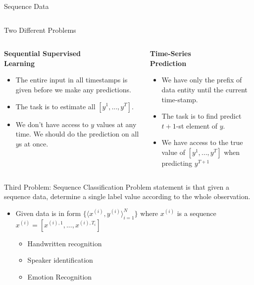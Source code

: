 \documentclass{beamer}
\begin{document}
\begin{frame}{Sequence Data}
\begin{columns}
\begin{column}{0.4\textwidth}
			\end{column}
		\end{columns}
	\end{frame}

	\begin{frame}{Two Different Problems}
		\begin{columns}
			\begin{column}{0.5\textwidth}
				\begin{center}
					\textbf{Sequential Supervised\\ Learning}
					\begin{itemize}
						\item<1-> The entire input in all timestamps is given before we make any predictions.
						\item<2-> The task is to estimate all $[y^1 , ... , y^T]$.
						\item<3-> We don't have access to $y$ values at any time. We should do the prediction on all $y$s at once.
						
					\end{itemize}
				\end{center}
			\end{column}
			\begin{column}{0.5\textwidth}
				\begin{center}
					\textbf{Time-Series\\ Prediction}
					\begin{itemize}
						\item<1-> We have only the prefix of data entity until the current time-stamp.
						\item<2-> The task is to find predict $t+1$-st element of $y$. 
						\item<3-> We have access to the true value of $[y^1 , ... , y^T]$ when predicting $y^{T + 1}$
					\end{itemize}
				\end{center}
			\end{column}
		\end{columns}
	\end{frame}

	\begin{frame}{Third Problem: Sequence Classification}
		Problem statement is that given a sequence data, determine a single label value according to the whole observation. \begin{itemize}
			\item Given data is in form  $\{ \langle x^{(i)},y^{(i)} \rangle_{i = 1}^{N} \}$ where $x^{(i)}$ is a sequence $x^{(i)} = [x^{(i) , 1} , ... , x^{(i), T_i}]$
			\begin{itemize}
				\item Handwritten recognition
				\item Speaker identification
				\item Emotion Recognition
			\end{itemize}
		\end{itemize}
	\end{frame}
\end{document}
